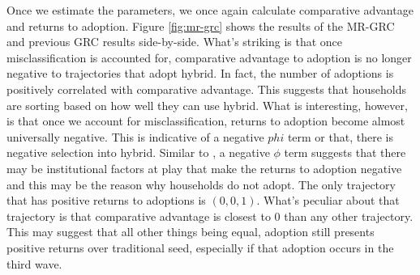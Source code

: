 \documentclass[11pt]{article}
\begin{document}
Once we estimate the parameters, we once again calculate comparative advantage and returns to adoption. Figure \ref{fig:mr-grc} shows the results of the MR-GRC and previous GRC results side-by-side. What's striking is that once misclassification is accounted for, comparative advantage to adoption is no longer negative to trajectories that adopt hybrid. In fact, the number of adoptions is positively correlated with comparative advantage. This suggests that households are sorting based on how well they can use hybrid. What is interesting, however, is that once we account for misclassification, returns to adoption become almost universally negative. This is indicative of a negative $phi$ term or that, there is negative selection into hybrid. Similar to \cite{Suri2011-oi}, a negative $\phi$ term suggests that there may be institutional factors at play that make the returns to adoption negative and this may be the reason why households do not adopt. The only trajectory that has positive returns to adoptions is $(0,0,1)$. What's peculiar about that trajectory is that comparative advantage is closest to 0 than any other trajectory. This may suggest that all other things being equal, adoption still presents positive returns over traditional seed, especially if that adoption occurs in the third wave.
\end{document}
